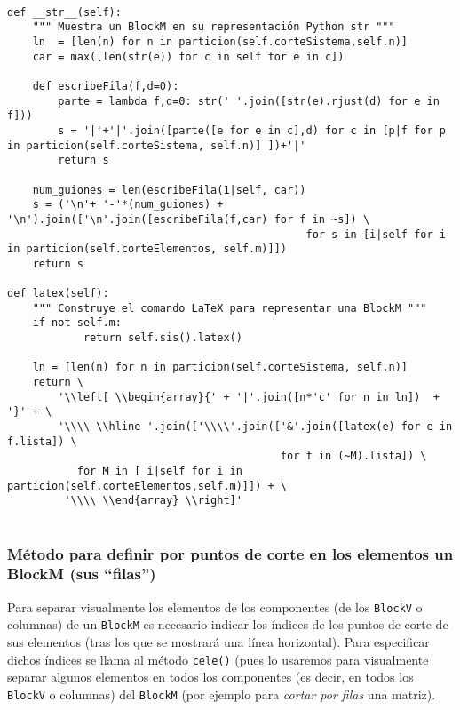 \documentclass[11pt]{report}
\begin{document}
\begin{verbatim}

def __str__(self):
    """ Muestra un BlockM en su representación Python str """
    ln  = [len(n) for n in particion(self.corteSistema,self.n)]
    car = max([len(str(e)) for c in self for e in c])

    def escribeFila(f,d=0):
        parte = lambda f,d=0: str(' '.join([str(e).rjust(d) for e in f])) 
        s = '|'+'|'.join([parte([e for e in c],d) for c in [p|f for p in particion(self.corteSistema, self.n)] ])+'|'
        return s
    
    num_guiones = len(escribeFila(1|self, car))
    s = ('\n'+ '-'*(num_guiones) + '\n').join(['\n'.join([escribeFila(f,car) for f in ~s]) \
                                               for s in [i|self for i in particion(self.corteElementos, self.m)]])
    return s

def latex(self):
    """ Construye el comando LaTeX para representar una BlockM """
    if not self.m:
            return self.sis().latex()

    ln = [len(n) for n in particion(self.corteSistema, self.n)]                                                           
    return \
        '\\left[ \\begin{array}{' + '|'.join([n*'c' for n in ln])  + '}' + \
        '\\\\ \\hline '.join(['\\\\'.join(['&'.join([latex(e) for e in f.lista]) \
                                           for f in (~M).lista]) \
           for M in [ i|self for i in particion(self.corteElementos,self.m)]]) + \
         '\\\\ \\end{array} \\right]'
        
\end{verbatim}

\subsubsection{Método para definir por puntos de corte en los elementos un BlockM (sus ``filas'')}
\label{sec:org4f4e9b9}

Para separar visualmente los elementos de los componentes (de los
\texttt{BlockV} o columnas) de un \texttt{BlockM} es necesario indicar los índices
de los puntos de corte de sus elementos (tras los que se mostrará una
línea horizontal). Para especificar dichos índices se llama al método
\texttt{cele()} (pues lo usaremos para visualmente separar algunos elementos
en todos los componentes (es decir, en todos los \texttt{BlockV} o columnas)
del \texttt{BlockM} (por ejemplo para \emph{cortar por filas} una matriz).
\end{document}
